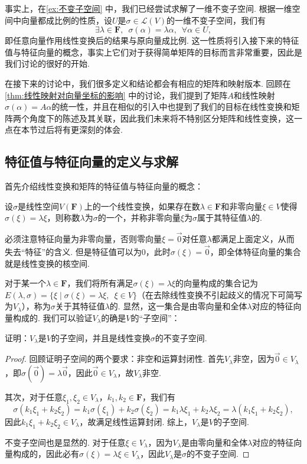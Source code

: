 事实上，在\autoref{ex:不变子空间} 中，我们已经尝试求解了一维不变子空间. 根据一维空间中向量都成比例的性质，设$U$是$\sigma\in\mathcal{L}(V)$的一维不变子空间，我们有
\[\exists\lambda\in\mathbf{F},\enspace\sigma(\alpha)=\lambda\alpha,\enspace\forall \alpha\in U,\]
即任意向量作用线性变换后的结果与原向量成比例. 这一性质将引入接下来的特征值与特征向量的概念，事实上它们对于获得简单矩阵的目标而言非常重要，因此是我们讨论的很好的开始.

在接下来的讨论中，我们很多定义和结论都会有相应的矩阵和映射版本. 回顾在\autoref{thm:线性映射对向量坐标的影响} 中的讨论，我们提到了矩阵$A$和线性映射$\sigma(\alpha)=A\alpha$的统一性，并且在相似的引入中也提到了我们的目标在线性变换和矩阵两个角度下的陈述及其关联，因此我们未来将不特别区分矩阵和线性变换，这一点在本节过后将有更深刻的体会.

\subsection{特征值与特征向量的定义与求解}

首先介绍线性变换和矩阵的特征值与特征向量的概念：
\begin{definition}{}{}
    设$\sigma$是线性空间$V(\mathbf{F})$上的一个线性变换，如果存在数$\lambda\in\mathbf{F}$和非零向量$\xi\in V$使得$\sigma(\xi)=\lambda\xi$，则称数$\lambda$为$\sigma$的一个，并称非零向量$\xi$为$\sigma$属于其特征值$\lambda$的.
\end{definition}
必须注意特征向量为非零向量，否则零向量$\xi=\vec{0}$对任意$\lambda$都满足上面定义，从而失去``特征''的含义. 但是特征值可以为0，此时$\sigma(\xi)=\vec{0}$，即全体特征向量的集合就是线性变换的核空间.

对于某一个$\lambda\in\mathbf{F}$，我们将所有满足$\sigma(\xi)=\lambda\xi$的向量构成的集合记为$E(\lambda,\sigma)=\{\xi \mid \sigma(\xi)=\lambda\xi,\enspace\xi\in V\}$（在去除线性变换不引起歧义的情况下可简写为$V_\lambda$），称为$\sigma$关于其特征值$\lambda$的. 显然，这一集合是由零向量和全体$\lambda$对应的特征向量构成的. 我们可以验证$V_\lambda$的确是$V$的``子空间''：
\begin{example}{}{}
    证明：$V_\lambda$是$V$的子空间，并且是线性变换$\sigma$的不变子空间.
\end{example}

\begin{proof}
    回顾证明子空间的两个要求：非空和运算封闭性. 首先$V_\lambda$非空，因为$\vec{0}\in V_\lambda$，即$\sigma(\vec{0})=\lambda\vec{0}$，因此$\vec{0}\in V_\lambda$，故$V_\lambda$非空.

    其次，对于任意$\xi_1,\xi_2\in V_\lambda$，$k_1,k_2\in\mathbf{F}$，我们有
    \[\sigma(k_1\xi_1+k_2\xi_2)=k_1\sigma(\xi_1)+k_2\sigma(\xi_2)=k_1\lambda\xi_1+k_2\lambda\xi_2=\lambda(k_1\xi_1+k_2\xi_2),\]
    因此$k_1\xi_1+k_2\xi_2\in V_\lambda$，故满足线性运算封闭. 综上，$V_\lambda$是$V$的子空间.

    不变子空间也是显然的. 对于任意$\xi\in V_\lambda$，因为$V_\lambda$是由零向量和全体$\lambda$对应的特征向量构成的，因此必有$\sigma(\xi)=\lambda\xi\in V_\lambda$，因此$V_\lambda$是$\sigma$的不变子空间.
\end{proof}

